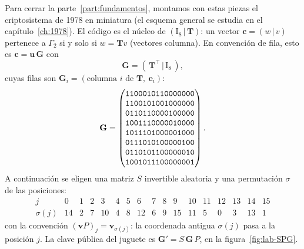\documentclass[11pt,a4paper,oneside]{report}
\newcommand{\Gmat}{\mathbf{G}}          %
\newcommand{\Tmat}{\mathbf{T}}          %
\newcommand{\ve}{\mathbf{e}}
\newcommand{\vc}{\mathbf{c}}
\newcommand{\vu}{\mathbf{u}}
\newcommand{\vv}{\mathbf{v}}
\newcommand{\hx}[1]{\text{\texttt{#1}}}
\begin{document}
Para cerrar la parte~\ref{part:fundamentos}, montamos con estas piezas el
criptosistema de 1978 en miniatura (el esquema general se estudia en el
capítulo~\ref{ch:1978}). El código es el núcleo de
$(\mathrm{I}_8\,|\,\Tmat)$: un vector $\vc=(w\,|\,v)$ pertenece a
$\Gamma_2$ si y solo si $w=\Tmat v$ (vectores columna). En convención de
fila, esto es $\vc=\vu\,\Gmat$ con
\begin{equation}
\Gmat=(\,\Tmat^{\top}\,|\,\mathrm{I}_8\,),
\label{eq:lab-G}
\end{equation}
cuyas filas son $\Gmat_i=(\text{columna }i\text{ de }\Tmat,\ \ve_i)$:
\[
\Gmat=
\begin{pmatrix}
\hx{1100010110000000}\\
\hx{1100101001000000}\\
\hx{0110110000100000}\\
\hx{1001110000010000}\\
\hx{1011101000001000}\\
\hx{0111010100000100}\\
\hx{0110101100000010}\\
\hx{1001011100000001}
\end{pmatrix}.
\]
A continuación se eligen una matriz $S$ invertible aleatoria y una
permutación $\sigma$ de las posiciones:
\[
\begin{array}{r|cccccccccccccccc}
j&0&1&2&3&4&5&6&7&8&9&10&11&12&13&14&15\\\hline
\sigma(j)&14&2&7&10&4&8&12&6&9&15&11&5&0&3&13&1
\end{array}
\]
con la convención $(\vv P)_j=\vv_{\sigma(j)}$: la coordenada antigua
$\sigma(j)$ pasa a la posición $j$. La clave pública del juguete es
$\Gmat'=S\,\Gmat\,P$, en la figura~\ref{fig:lab-SPG}.
\end{document}

